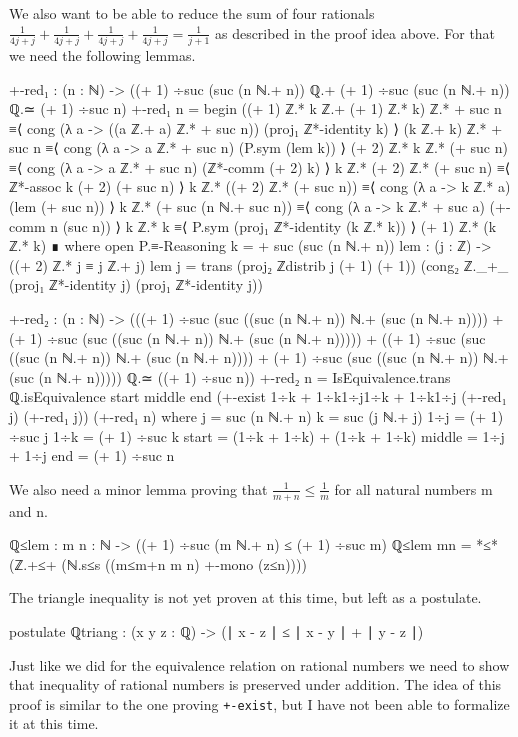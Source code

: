 \documentclass[11pt,a4paper]{article}
\begin{document}
We also want to be able to reduce the sum of four rationals $\frac{1}{4j + j} + \frac{1}{4j + j} + \frac{1}{4j + j} + \frac{1}{4j + j} = \frac{1}{j +1}$ as described in the proof idea above. For that we need the following lemmas.
\begin{code}
+-red₁ : (n : ℕ) -> ((+ 1) ÷suc (suc (n ℕ.+ n)) ℚ.+ (+ 1) ÷suc (suc (n ℕ.+ n)) ℚ.≃ (+ 1) ÷suc n)
+-red₁ n = begin 
      ((+ 1) ℤ.* k ℤ.+ (+ 1) ℤ.* k) ℤ.* + suc n ≡⟨ cong (λ a -> ((a ℤ.+ a) ℤ.* + suc n)) (proj₁ ℤ*-identity k) ⟩
      (k ℤ.+ k) ℤ.* + suc n ≡⟨ cong (λ a -> a ℤ.* + suc n) (P.sym (lem k)) ⟩
      (+ 2) ℤ.* k ℤ.* (+ suc n) ≡⟨ cong (λ a -> a ℤ.* + suc n) (ℤ*-comm (+ 2) k) ⟩
      k ℤ.* (+ 2) ℤ.* (+ suc n) ≡⟨ ℤ*-assoc k (+ 2) (+ suc n) ⟩
      k ℤ.* ((+ 2) ℤ.* (+ suc n)) ≡⟨ cong (λ a -> k ℤ.* a) (lem (+ suc n)) ⟩
      k ℤ.* (+ suc (n ℕ.+ suc n)) ≡⟨ cong (λ a -> k ℤ.* + suc a) (+-comm n (suc n)) ⟩
      k ℤ.* k ≡⟨ P.sym (proj₁ ℤ*-identity (k ℤ.* k)) ⟩
      (+ 1) ℤ.* (k ℤ.* k)
    ∎
    where
      open P.≡-Reasoning
      k = + suc (suc (n ℕ.+ n))
      lem : (j : ℤ) -> ((+ 2) ℤ.* j ≡ j ℤ.+ j)
      lem j = trans (proj₂ ℤdistrib j (+ 1) (+ 1)) (cong₂ ℤ._+_ (proj₁ ℤ*-identity j) (proj₁ ℤ*-identity j)) 

+-red₂ : (n : ℕ) -> (((+ 1) ÷suc (suc ((suc (n ℕ.+ n)) ℕ.+ (suc (n ℕ.+ n)))) + (+ 1) ÷suc (suc ((suc (n ℕ.+ n)) ℕ.+ (suc (n ℕ.+ n))))) + ((+ 1) ÷suc (suc ((suc (n ℕ.+ n)) ℕ.+ (suc (n ℕ.+ n)))) + (+ 1) ÷suc (suc ((suc (n ℕ.+ n)) ℕ.+ (suc (n ℕ.+ n))))) ℚ.≃ ((+ 1) ÷suc n))
+-red₂ n = IsEquivalence.trans ℚ.isEquivalence {start} {middle} {end} (+-exist {1÷k + 1÷k}{1÷j}{1÷k + 1÷k}{1÷j} (+-red₁ j) (+-red₁ j)) (+-red₁ n)
  where
    j = suc (n ℕ.+ n)
    k = suc (j ℕ.+ j)
    1÷j = (+ 1) ÷suc j
    1÷k = (+ 1) ÷suc k
    start = (1÷k + 1÷k) + (1÷k + 1÷k)
    middle = 1÷j + 1÷j
    end = (+ 1) ÷suc n
\end{code}
We also need a minor lemma proving that $\frac{1}{m + n} \leq \frac{1}{m}$ for all natural numbers m and n.
\begin{code}
ℚ≤lem : {m n : ℕ} -> ((+ 1) ÷suc (m ℕ.+ n) ≤ (+ 1) ÷suc m)
ℚ≤lem {m}{n} =  *≤* (ℤ.+≤+ (ℕ.s≤s ((m≤m+n m n) +-mono (z≤n))))
\end{code}
The triangle inequality is not yet proven at this time, but left as a postulate.
\begin{code}
postulate ℚtriang : (x y z : ℚ) -> (∣ x - z ∣ ≤ ∣ x - y ∣ + ∣ y - z ∣)
\end{code}
Just like we did for the equivalence relation on rational numbers we need to show that inequality of rational numbers is preserved under addition. The idea of this proof is similar to the one proving \texttt{+-exist}, but I have not been able to formalize it at this time.
\end{document}

